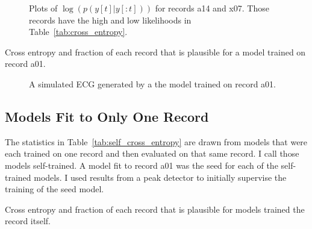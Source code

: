 \documentclass[12pt]{article}
\begin{document}
\begin{figure}
  \centering
  \caption{Plots of $\log\left(p(y[t]|y[:t]) \right)$ for records a14
    and x07.  Those records have the high and low likelihoods in
    Table~\ref{tab:cross_entropy}.}
  \label{fig:likelihood}
\end{figure}

\begin{table}
  \centering
    
  \caption[Cross Entropy]{Cross entropy and fraction of each record
    that is plausible for a model trained on record a01.}
  \label{tab:cross_entropy}
\end{table}

\begin{figure}
  \centering
  \caption{A simulated ECG generated by a the model trained on record a01.}
  \label{fig:simulated}
\end{figure}

\subsection{Models Fit to Only One Record}
\label{sec:selves}

The statistics in Table~\ref{tab:self_cross_entropy} are drawn from
models that were each trained on one record and then evaluated on that
same record.  I call those models self-trained.  A model fit to record
a01 was the seed for each of the self-trained models.  I used results
from a peak detector to initially supervise the training of the seed
model.

\begin{table}
  \centering
    
  \caption[Cross Entropy]{Cross entropy and fraction of each record
    that is plausible for models trained the record itself.}
  \label{tab:self_cross_entropy}
\end{table}
\end{document}
